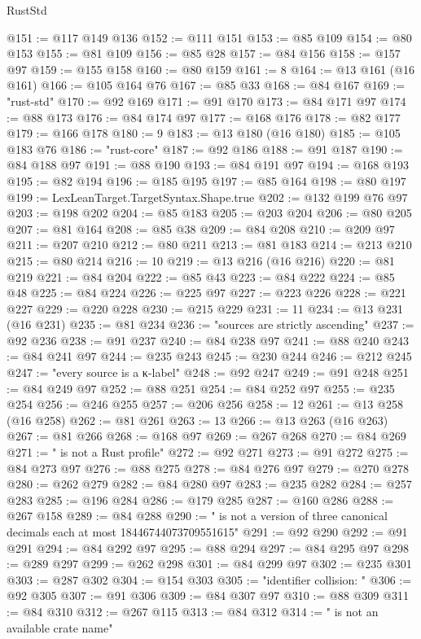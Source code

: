 \begin{lexlean}{RustStd}
\begin{coremodule}
@151 := @117 @149 @136
@152 := @111 @151
@153 := @85 @109
@154 := @80 @153
@155 := @81 @109
@156 := @85 @28
@157 := @84 @156
@158 := @157 @97
@159 := @155 @158
@160 := @80 @159
@161 := 8
@164 := @13 @161 (@16 @161)
@166 := @105 @164 @76
@167 := @85 @33
@168 := @84 @167
@169 := "rust-std"
@170 := @92 @169
@171 := @91 @170
@173 := @84 @171 @97
@174 := @88 @173
@176 := @84 @174 @97
@177 := @168 @176
@178 := @82 @177
@179 := @166 @178
@180 := 9
@183 := @13 @180 (@16 @180)
@185 := @105 @183 @76
@186 := "rust-core"
@187 := @92 @186
@188 := @91 @187
@190 := @84 @188 @97
@191 := @88 @190
@193 := @84 @191 @97
@194 := @168 @193
@195 := @82 @194
@196 := @185 @195
@197 := @85 @164
@198 := @80 @197
@199 := LexLeanTarget.TargetSyntax.Shape.true
@202 := @132 @199 @76 @97
@203 := @198 @202
@204 := @85 @183
@205 := @203 @204
@206 := @80 @205
@207 := @81 @164
@208 := @85 @38
@209 := @84 @208
@210 := @209 @97
@211 := @207 @210
@212 := @80 @211
@213 := @81 @183
@214 := @213 @210
@215 := @80 @214
@216 := 10
@219 := @13 @216 (@16 @216)
@220 := @81 @219
@221 := @84 @204
@222 := @85 @43
@223 := @84 @222
@224 := @85 @48
@225 := @84 @224
@226 := @225 @97
@227 := @223 @226
@228 := @221 @227
@229 := @220 @228
@230 := @215 @229
@231 := 11
@234 := @13 @231 (@16 @231)
@235 := @81 @234
@236 := "sources are strictly ascending"
@237 := @92 @236
@238 := @91 @237
@240 := @84 @238 @97
@241 := @88 @240
@243 := @84 @241 @97
@244 := @235 @243
@245 := @230 @244
@246 := @212 @245
@247 := "every source is a κ-label"
@248 := @92 @247
@249 := @91 @248
@251 := @84 @249 @97
@252 := @88 @251
@254 := @84 @252 @97
@255 := @235 @254
@256 := @246 @255
@257 := @206 @256
@258 := 12
@261 := @13 @258 (@16 @258)
@262 := @81 @261
@263 := 13
@266 := @13 @263 (@16 @263)
@267 := @81 @266
@268 := @168 @97
@269 := @267 @268
@270 := @84 @269
@271 := " is not a Rust profile"
@272 := @92 @271
@273 := @91 @272
@275 := @84 @273 @97
@276 := @88 @275
@278 := @84 @276 @97
@279 := @270 @278
@280 := @262 @279
@282 := @84 @280 @97
@283 := @235 @282
@284 := @257 @283
@285 := @196 @284
@286 := @179 @285
@287 := @160 @286
@288 := @267 @158
@289 := @84 @288
@290 := " is not a version of three canonical decimals each at most 18446744073709551615"
@291 := @92 @290
@292 := @91 @291
@294 := @84 @292 @97
@295 := @88 @294
@297 := @84 @295 @97
@298 := @289 @297
@299 := @262 @298
@301 := @84 @299 @97
@302 := @235 @301
@303 := @287 @302
@304 := @154 @303
@305 := "identifier collision: "
@306 := @92 @305
@307 := @91 @306
@309 := @84 @307 @97
@310 := @88 @309
@311 := @84 @310
@312 := @267 @115
@313 := @84 @312
@314 := " is not an available crate name"

\end{coremodule}
\end{lexlean}
